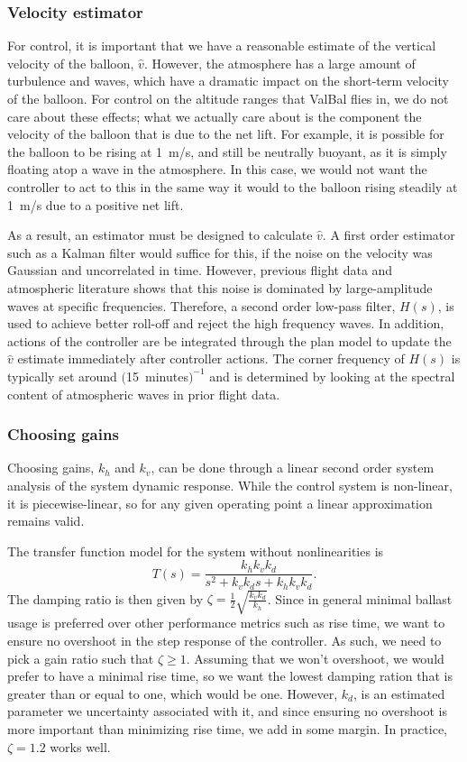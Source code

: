 \documentclass[11pt]{scrartcl} %
\begin{document}
\subsubsection{Velocity estimator}

For control, it is important that we have a reasonable estimate of the vertical velocity of the balloon, $\hat v$. However, the atmosphere has a large amount of turbulence and waves, which have a dramatic impact on the short-term velocity of the balloon. For control on the altitude ranges that ValBal flies in, we do not care about these effects; what we actually care about is the component the velocity of the balloon that is due to the net lift. For example, it is possible for the balloon to be rising at 1~m/s, and still be neutrally buoyant, as it is simply floating atop a wave in the atmosphere. In this case, we would not want the controller to act to this in the same way it would to the balloon rising steadily at 1~m/s due to a positive net lift.

As a result, an estimator must be designed to calculate $\hat v$. A first order estimator such as a Kalman filter would suffice for this, if the noise on the velocity was Gaussian and uncorrelated in time. However, previous flight data and atmospheric literature \cite{waves} shows that this noise is dominated by large-amplitude waves at specific frequencies. Therefore, a second order low-pass filter, $H(s)$, is used to achieve better roll-off and reject the high frequency waves. In addition, actions of the controller are be integrated through the plan model to update the $\hat v$ estimate immediately after controller actions. The corner frequency of $H(s)$ is typically set around $($15~minutes$)^{-1}$ and is determined by looking at the spectral content of atmospheric waves in prior flight data.

\subsubsection{Choosing gains}

Choosing gains, $k_h$ and $k_v$, can be done through a linear second order system analysis of the system dynamic response. While the control system is non-linear, it is piecewise-linear, so for any given operating point a linear approximation remains valid.

The transfer function model for the system without nonlinearities is 
\[T(s) = \frac{k_h k_v k_d}{s^2 + k_v k_d s + k_h k_v k_d}.\]
The damping ratio is then given by $\zeta = \frac{1}{2}\sqrt{\frac{k_v k_d}{k_h}}$. Since in general minimal ballast usage is preferred over other performance metrics such as rise time, we want to ensure no overshoot in the step response of the controller. As such, we need to pick a gain ratio such that $\zeta \geq 1$. Assuming that we won't overshoot, we would prefer to have a minimal rise time, so we want the lowest damping ration that is greater than or equal to one, which would be one. However, $k_d$, is an estimated parameter we uncertainty associated with it, and since ensuring no overshoot is more important than minimizing rise time, we add in some margin. In practice, $\zeta = 1.2$ works well.
\end{document}
